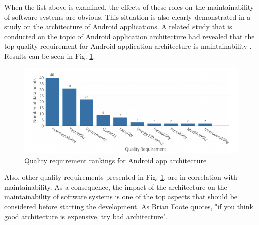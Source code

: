 When the list above is examined, the effects of these roles on the maintainability of software systems are obvious. This situation is also clearly demonstrated in a study on the architecture of Android applications. A related study that is conducted on the topic of Android application architecture had revealed that the top quality requirement for Android application architecture is maintainability \cite{14}. Results can be seen in Fig. \ref{fig:arch_quality_req_ranking}.
\begin{figure}[ht!]
    \centering
    \includegraphics[scale=0.5]{figures/quality_req.png}
    \caption{Quality requirement rankings for Android app architecture \protect\cite{14}}
    \label{fig:arch_quality_req_ranking}
\end{figure}
\FloatBarrier

Also, other quality requirements presented in Fig. \ref{fig:arch_quality_req_ranking}, are in correlation with maintainability. As a consequence, the impact of the architecture on the maintainability of software systems is one of the top aspects that should be considered before starting the development. As Brian Foote quotes, "if you think good architecture is expensive, try bad architecture"\cite{10}.